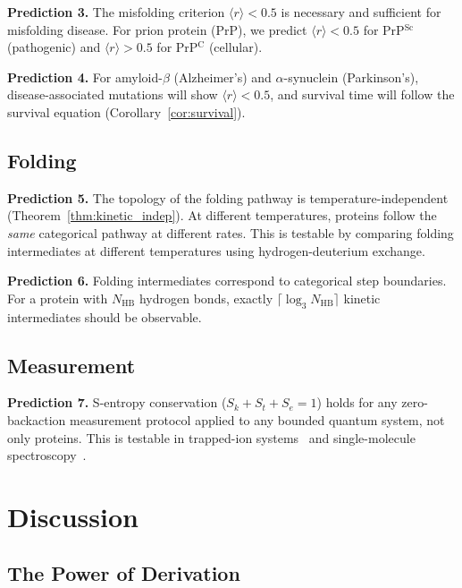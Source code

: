 \documentclass[aps,prx,superscriptaddress,twocolumn,10pt,a4paper,longbibliography,preprint]{revtex4-2}
\newcommand{\orderp}{\langle r \rangle}
\theoremstyle{definition}
\theoremstyle{remark}
\begin{document}
\textbf{Prediction 3.} The misfolding criterion $\orderp < 0.5$ is necessary and sufficient for misfolding disease. For prion protein (PrP), we predict $\orderp < 0.5$ for PrP$^{\text{Sc}}$ (pathogenic) and $\orderp > 0.5$ for PrP$^{\text{C}}$ (cellular).

\textbf{Prediction 4.} For amyloid-$\beta$ (Alzheimer's) and $\alpha$-synuclein (Parkinson's), disease-associated mutations will show $\orderp < 0.5$, and survival time will follow the survival equation (Corollary~\ref{cor:survival}).

\subsection{Folding}

\textbf{Prediction 5.} The topology of the folding pathway is temperature-independent (Theorem~\ref{thm:kinetic_indep}). At different temperatures, proteins follow the \emph{same} categorical pathway at different rates. This is testable by comparing folding intermediates at different temperatures using hydrogen-deuterium exchange.

\textbf{Prediction 6.} Folding intermediates correspond to categorical step boundaries. For a protein with $N_{\text{HB}}$ hydrogen bonds, exactly $\lceil \log_3 N_{\text{HB}} \rceil$ kinetic intermediates should be observable.

\subsection{Measurement}

\textbf{Prediction 7.} S-entropy conservation ($S_k + S_t + S_e = 1$) holds for any zero-backaction measurement protocol applied to any bounded quantum system, not only proteins. This is testable in trapped-ion systems~\cite{Wineland2013} and single-molecule spectroscopy~\cite{Moerner2015}.

\section{Discussion}
\label{sec:discussion}

\subsection{The Power of Derivation}
\end{document}
